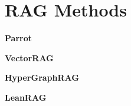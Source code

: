 \section{RAG Methods}

\textbf{Parrot}

\textbf{VectorRAG}

\textbf{HyperGraphRAG}

\textbf{LeanRAG}